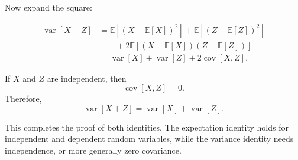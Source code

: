 \documentclass{article}
\begin{document}
\begin{tcolorbox}[breakable,colback=gray!5,colframe=gray!60,title=Solution]
Now expand the square:

\begin{align*}
  \operatorname{var}[X+Z]
  &=
  \mathbb{E}\left[(X-\mathbb{E}[X])^2\right]
  +
  \mathbb{E}\left[(Z-\mathbb{E}[Z])^2\right] \\
  &\qquad
  +
  2\mathbb{E}\left[(X-\mathbb{E}[X])(Z-\mathbb{E}[Z])\right] \\
  &=
  \operatorname{var}[X]
  +
  \operatorname{var}[Z]
  +
  2\operatorname{cov}[X,Z].
\end{align*}

If \(X\) and \(Z\) are independent, then
\[
  \operatorname{cov}[X,Z]=0.
\]
Therefore,
\[
  \operatorname{var}[X+Z]
  =
  \operatorname{var}[X]+\operatorname{var}[Z].
\]

This completes the proof of both identities. The expectation identity holds for
independent and dependent random variables, while the variance identity needs
independence, or more generally zero covariance.
\end{tcolorbox}
\end{document}
